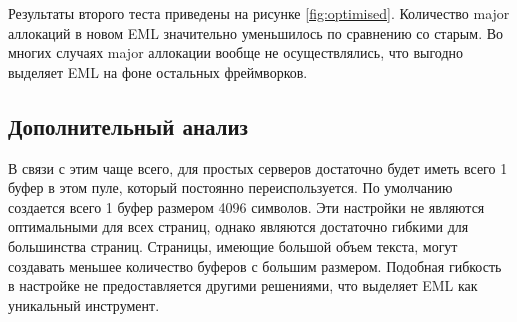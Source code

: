Результаты второго теста приведены на рисунке \ref{fig:optimised}.
Количество major аллокаций в новом EML значительно уменьшилось по сравнению со старым.
Во многих случаях major аллокации вообще не осуществлялись, что выгодно выделяет EML на фоне остальных фреймворков.



\subsection{Дополнительный анализ}


В связи с этим чаще всего, для простых серверов достаточно будет иметь всего 1 буфер в этом пуле, который постоянно переиспользуется.
По умолчанию создается всего 1 буфер размером 4096 символов.
Эти настройки не являются оптимальными для всех страниц, однако являются достаточно гибкими для большинства страниц.
Страницы, имеющие большой объем текста, могут создавать меньшее количество буферов с большим размером.
Подобная гибкость в настройке не предоставляется другими решениями, что выделяет EML как уникальный инструмент.


